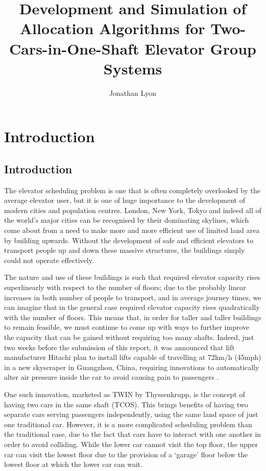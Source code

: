 \documentclass{UoYCSproject}
\author{Jonathan Lyon}
\title{Development and Simulation of Allocation Algorithms for Two-Cars-in-One-Shaft Elevator Group Systems}
\begin{document}
\renewcommand{\thepage}{\roman{page}}
\maketitle

\newpage
\thispagestyle{empty}
\mbox{}

\chapter{Introduction}
\setcounter{page}{1}
\renewcommand{\thepage}{\arabic{page}}

\section{Introduction}

The elevator scheduling problem is one that is often completely overlooked by the average elevator user, but it is one of huge importance to the development of modern cities and population centres.  London, New York, Tokyo and indeed all of the world's major cities can be recognised by their dominating skylines, which come about from a need to make more and more efficient use of limited land area by building upwards.  Without the development of safe and efficient elevators to transport people up and down these massive structures, the buildings simply could not operate effectively.

The nature and use of these buildings is such that required elevator capacity rises superlinearly with respect to the number of floors; due to the probably linear increases in both number of people to transport, and in average journey times, we can imagine that in the general case required elevator capacity rises quadratically with the number of floors.  This means that, in order for taller and taller buildings to remain feasible, we must continue to come up with ways to further improve the capacity that can be gained without requiring too many shafts.  Indeed, just two weeks before the submission of this report, it was announced that lift manufacturer Hitachi plan to install lifts capable of travelling at 72km/h (45mph) in a new skyscraper in Guangzhou, China, requiring innovations to automatically alter air pressure inside the car to avoid causing pain to passengers \citep{BBC2014}.

One such innovation, marketed as TWIN by Thyssenkrupp, is the concept of having two cars in the same shaft (TCOS).  This brings benefits of having two separate cars serving passengers independently, using the same land space of just one traditional car.  However, it is a more complicated scheduling problem than the traditional case, due to the fact that cars have to interact with one another in order to avoid colliding.  While the lower car cannot visit the top floor, the upper car can visit the lowest floor due to the provision of a `garage' floor below the lowest floor at which the lower car can wait.
\end{document}
